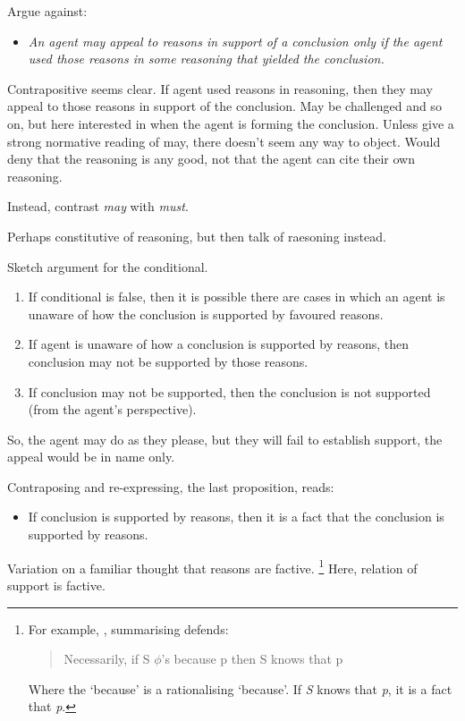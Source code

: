 \documentclass[10pt]{article}
\begin{document}
Argue against:
\begin{itemize}
\item\label{denied-claim} \emph{An agent may appeal to reasons in support of a conclusion only if the agent used those reasons in some reasoning that yielded the conclusion.}
\end{itemize}

Contrapositive seems clear.
If agent used reasons in reasoning, then they may appeal to those reasons in support of the conclusion.
May be challenged and so on, but here interested in when the agent is forming the conclusion.
Unless give a strong normative reading of may, there doesn't seem any way to object.
Would deny that the reasoning is any good, not that the agent can cite their own reasoning.

Instead, contrast \emph{may} with \emph{must}.

Perhaps constitutive of reasoning, but then talk of raesoning instead.

Sketch argument for the conditional.

\begin{enumerate}
\item\label{opp:sketch:1} If conditional is false, then it is possible there are cases in which an agent is unaware of how the conclusion is supported by favoured reasons.
\item\label{opp:sketch:2} If agent is unaware of how a conclusion is supported by reasons, then conclusion may not be supported by those reasons.
\item\label{opp:sketch:3} If conclusion may not be supported, then the conclusion is not supported (from the agent's perspective).
\end{enumerate}

So, the agent may do as they please, but they will fail to establish support, the appeal would be in name only.

Contraposing and re-expressing, the last proposition, reads:

\begin{itemize}
\item If conclusion is supported by reasons, then it is a fact that the conclusion is supported by reasons.
\end{itemize}

Variation on a familiar thought that reasons are factive.\nolinebreak
\footnote{
  For example, \textcite[673]{Cunningham:2020aa}, summarising \textcite{Hornsby:2007aa,Hornsby:2007ab,Hornsby:2008aa} defends:
  \begin{quote}
    Necessarily, if S \(\phi\)'s because p then S knows that p
  \end{quote}
  Where the `because' is a rationalising `because'.
  If \emph{S} knows that \emph{p}, it is a fact that \emph{p}.
}
Here, relation of support is factive.
\end{document}
